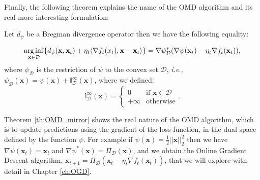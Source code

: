
Finally, the following theorem explains the name of the OMD algorithm and its real more interesting formulation:

\begin{theorem}\label{th:OMD_mirror}
Let $d_\psi$ be a Bregman divergence operator then we have the following equality:

\begin{equation}
\operatorname*{arg\,inf}\limits_{\mathbf x\in\mathcal D}\{d_\psi(\mathbf x,\mathbf x_t)+\eta_t\langle\nabla f_t(x_t),\mathbf x-\mathbf x_t\rangle\}=\nabla \psi_{\mathcal D}^*(\nabla \psi(\mathbf x_t)-\eta_t\nabla f_t(\mathbf x_t)),
\end{equation}
where $\psi_\mathcal D$ is the restriction of $\psi$ to the convex set $\mathcal D$, \emph{i.e.,} $\psi_\mathcal D(\mathbf x)=\psi(\mathbf x)+\mathbb I^\infty_\mathcal D(\mathbf x)$, where we defined:
\begin{equation*}
\mathbb I_\mathcal D^\infty(\mathbf x)=\begin{cases}
0&\text{if $\mathbf x\in\mathcal D$}\\
+\infty&\text{otherwise}
\end{cases}.
\end{equation*}
\end{theorem}



Theorem \ref{th:OMD_mirror} shows the real nature of the OMD algorithm, which is to up{}date predictions using the gradient of the loss function, in the dual space defined by the function $\psi$. For example if $\psi(\mathbf x)=\frac{1}{2}||\mathbf x||_2^2$ then we have $\nabla \psi(\mathbf x_t)=\mathbf x_t$ and $\nabla \psi^*(\mathbf x)=\Pi_\mathcal D(\mathbf x)$, and we obtain the Online Gradient Descent algorithm, $\mathbf x_{t+1}=\Pi_\mathcal D(\mathbf x_t-\eta_t\nabla f_t(\mathbf x_t))$, that we will explore with detail in Chapter \ref{ch:OGD}.

